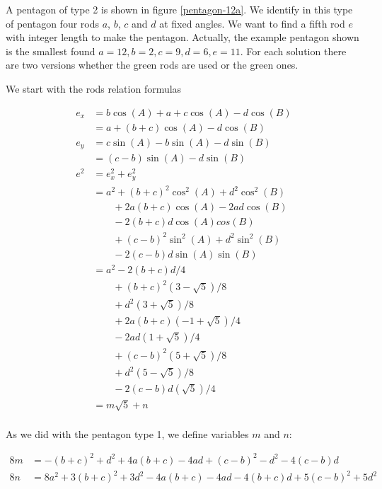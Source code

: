 \documentclass[11pt]{article}
\begin{document}
A pentagon of type 2 is shown in figure \ref{pentagon-12a}. We identify in this type of pentagon four rods $a$, $b$, $c$ and $d$ at fixed angles. We want to find a fifth rod $e$ with integer length to make the pentagon. Actually, the example pentagon shown is the smallest found $a=12, b=2, c=9, d=6, e=11$. For each solution there are two versions whether the green rods are used or the green ones.

We start with the rods relation formulas

\begin{align*}
e_x &= b\cos(A) + a + c\cos(A) - d\cos(B) \\
      &= a + (b + c)\cos(A) - d\cos(B) \\
e_y &= c\sin(A) - b\sin(A) - d\sin(B) \\
      &= (c - b)\sin(A) - d\sin(B) 
\\
e^2 &= e_x^2 + e_y^2 \\
    &= a^2 + (b + c)^2\cos^2(A) + d^2\cos^2(B) \\
    &\qquad + 2a(b + c)\cos(A) - 2ad\cos(B) \\
    &\qquad - 2(b + c)d\cos(A)cos(B) \\
    &\qquad + (c - b)^2\sin^2(A) + d^2\sin^2(B) \\
    &\qquad - 2(c - b)d\sin(A)\sin(B) \\
    &= a^2 - 2(b + c)d / 4 \\
    &\qquad + (b + c)^2 ( 3 - \sqrt{5}) / 8 \\
    &\qquad + d^2       ( 3 + \sqrt{5}) / 8 \\
    &\qquad + 2a(b + c) (-1 + \sqrt{5}) / 4 \\
    &\qquad - 2ad( 1 + \sqrt{5}) / 4 \\
    &\qquad + (c - b)^2 ( 5 + \sqrt{5}) / 8 \\
    &\qquad + d^2       ( 5 - \sqrt{5}) / 8 \\
    &\qquad - 2(c - b)d ( \sqrt{5}) / 4 \\
    &= m\sqrt{5} + n \\
\end{align*}

As we did with the pentagon type 1, we define variables $m$ and $n$:

\begin{align*}
8m &= -(b+c)^2 + d^2 + 4a(b+c) - 4ad + (c-b)^2 - d^2 - 4(c-b)d \\
8n &= 8a^2 + 3(b+c)^2 + 3d^2 - 4a(b+c) - 4ad - 4(b+c)d + 5(c-b)^2 + 5d^2 \\
\end{align*}
\end{document}
